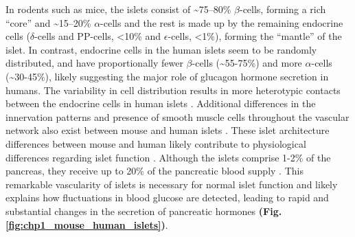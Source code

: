 \par In rodents such as mice, the islets consist of \textasciitilde75–80\% $\beta$-cells, forming a rich “core” and \textasciitilde15–20\% $\alpha$-cells and the rest is made up by the remaining endocrine cells ($\delta$-cells and PP-cells, <10\% and $\epsilon$-cells, <1\%), forming the “mantle” of the islet. In contrast, endocrine cells in the human islets seem to be randomly distributed, and have proportionally fewer $\beta$-cells (\textasciitilde55-75\%) and more $\alpha$-cells (\textasciitilde30-45\%), likely suggesting the major role of glucagon hormone secretion in humans. The variability in cell distribution results in more heterotypic contacts between the endocrine cells in human islets \textbf{\cite{walker_human_2021}}. %
Additional differences in the innervation patterns and presence of smooth muscle cells throughout the vascular network also exist between mouse and human islets \textbf{\cite{rodriguez-diaz_autonomic_2011}}. %
These islet architecture differences between mouse and human likely contribute to physiological differences regarding islet function \textbf{\cite{cabrera_unique_2006}}. %
Although the islets comprise 1-2\% of the pancreas, they receive up to 20\% of the pancreatic blood supply \textbf{\cite{muratore_vascular_2021,jansson_glucose-induced_1986}}. 
This remarkable vascularity of islets is necessary for normal islet function and likely explains how fluctuations in blood glucose are %
detected, %
leading to rapid and %
substantial changes in the secretion of pancreatic hormones \textbf{(Fig. \ref{fig:chp1_mouse_human_islets})}.\\


